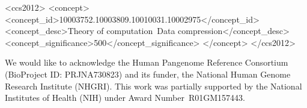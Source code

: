 \documentclass[sigconf]{acmart}
\begin{document}
\begin{CCSXML}
  <ccs2012>
  <concept>
  <concept_id>10003752.10003809.10010031.10002975</concept_id>
  <concept_desc>Theory of computation~Data compression</concept_desc>
  <concept_significance>500</concept_significance>
  </concept>
  </ccs2012>
\end{CCSXML}



\maketitle













\begin{acks}
We would like to acknowledge the Human Pangenome Reference Consortium (BioProject ID: PRJNA730823) and its funder, the National Human Genome Research Institute (NHGRI). This work was partially supported by the National Institutes of Health (NIH) under Award Number~R01GM157443.
\end{acks}



\end{document}
